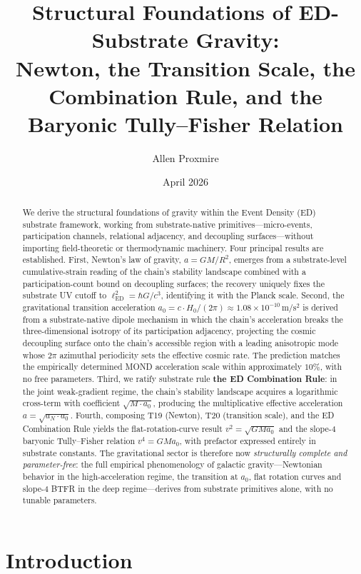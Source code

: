 \documentclass[11pt,a4paper]{article}
\title{Structural Foundations of ED-Substrate Gravity:\\
Newton, the Transition Scale, the Combination Rule, and the\\
Baryonic Tully--Fisher Relation}
\author{Allen Proxmire}
\date{April 2026}
\begin{document}
\maketitle

\begin{abstract}
We derive the structural foundations of gravity within the Event Density (ED) substrate framework, working from substrate-native primitives---micro-events, participation channels, relational adjacency, and decoupling surfaces---without importing field-theoretic or thermodynamic machinery. Four principal results are established. First, Newton's law of gravity, $a = GM/R^2$, emerges from a substrate-level cumulative-strain reading of the chain's stability landscape combined with a participation-count bound on decoupling surfaces; the recovery uniquely fixes the substrate UV cutoff to $\ell_{\mathrm{ED}}^2 = \hbar G / c^3$, identifying it with the Planck scale. Second, the gravitational transition acceleration $a_0 = c \cdot H_0 / (2\pi) \approx 1.08 \times 10^{-10}\,\mathrm{m/s^2}$ is derived from a substrate-native dipole mechanism in which the chain's acceleration breaks the three-dimensional isotropy of its participation adjacency, projecting the cosmic decoupling surface onto the chain's accessible region with a leading anisotropic mode whose $2\pi$ azimuthal periodicity sets the effective cosmic rate. The prediction matches the empirically determined MOND acceleration scale within approximately $10\%$, with no free parameters. Third, we ratify substrate rule \textbf{the ED Combination Rule}: in the joint weak-gradient regime, the chain's stability landscape acquires a logarithmic cross-term with coefficient $\sqrt{M\cdot a_0}$, producing the multiplicative effective acceleration $a = \sqrt{a_N \cdot a_0}$. Fourth, composing T19 (Newton), T20 (transition scale), and the ED Combination Rule yields the flat-rotation-curve result $v^2 = \sqrt{G M a_0}$ and the slope-4 baryonic Tully--Fisher relation $v^4 = G M a_0$, with prefactor expressed entirely in substrate constants. The gravitational sector is therefore now \emph{structurally complete and parameter-free}: the full empirical phenomenology of galactic gravity---Newtonian behavior in the high-acceleration regime, the transition at $a_0$, flat rotation curves and slope-4 BTFR in the deep regime---derives from substrate primitives alone, with no tunable parameters.
\end{abstract}

\section{Introduction}\label{sec:intro}
\end{document}
